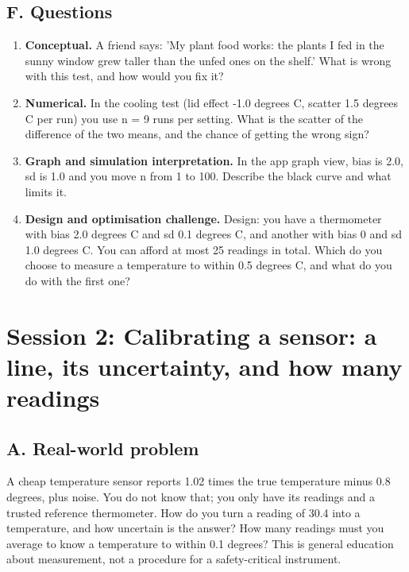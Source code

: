 \documentclass[11pt,a4paper]{article}
\begin{document}
\subsection*{F. Questions}
\begin{enumerate}[nosep]
\item \textbf{Conceptual.} A friend says: 'My plant food works: the plants I fed in the sunny window grew taller than the unfed ones on the shelf.' What is wrong with this test, and how would you fix it?
\item \textbf{Numerical.} In the cooling test (lid effect -1.0 degrees C, scatter 1.5 degrees C per run) you use n = 9 runs per setting. What is the scatter of the difference of the two means, and the chance of getting the wrong sign?
\item \textbf{Graph and simulation interpretation.} In the app graph view, bias is 2.0, sd is 1.0 and you move n from 1 to 100. Describe the black curve and what limits it.
\item \textbf{Design and optimisation challenge.} Design: you have a thermometer with bias 2.0 degrees C and sd 0.1 degrees C, and another with bias 0 and sd 1.0 degrees C. You can afford at most 25 readings in total. Which do you choose to measure a temperature to within 0.5 degrees C, and what do you do with the first one?
\end{enumerate}

\section{Session 2: Calibrating a sensor: a line, its uncertainty, and how many readings}

\subsection*{A. Real-world problem}
A cheap temperature sensor reports 1.02 times the true temperature minus 0.8 degrees, plus noise. You do not know that; you only have its readings and a trusted reference thermometer. How do you turn a reading of 30.4 into a temperature, and how uncertain is the answer? How many readings must you average to know a temperature to within 0.1 degrees? This is general education about measurement, not a procedure for a safety-critical instrument.
\end{document}

